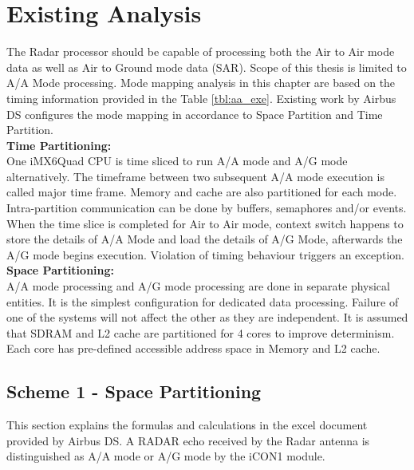 \chapter{Existing Analysis}
\label{chap:existing_analysis}
The Radar processor should be capable of processing both the Air to Air mode data as well as Air to Ground mode data (SAR). Scope of this thesis is limited to A/A Mode processing. Mode mapping analysis in this chapter are based on the timing information provided in the Table \ref{tbl:aa_exe}. Existing work by Airbus DS\cite{fcas} configures the mode mapping in accordance to Space Partition and Time Partition.\\ 

\noindent
\textbf{Time Partitioning:}\\
One iMX6Quad CPU is time sliced to run A/A mode and A/G mode alternatively. The timeframe between two subsequent A/A mode execution is called major time frame. Memory and cache are also partitioned for each mode. Intra-partition communication can be done by buffers, semaphores and/or events. When the time slice is completed for Air to Air mode, context switch happens to store the details of A/A Mode and load the details of A/G Mode, afterwards the A/G mode begins execution. Violation of timing behaviour triggers an exception. \\

\noindent
\textbf{Space Partitioning:} \\
A/A mode processing and A/G mode processing are done in separate physical entities. It is the simplest configuration for dedicated data processing. Failure of one of the systems will not affect the other as they are independent. It is assumed that SDRAM and L2 cache are partitioned for 4 cores to improve determinism. Each core has pre-defined accessible address space in Memory and L2 cache. 

\section{Scheme 1 - Space Partitioning}
\label{sec:scheme_1}
This section explains the formulas and calculations in the excel document provided by Airbus DS. A RADAR echo received by the Radar antenna is distinguished as A/A mode or A/G mode by the iCON1 module.

